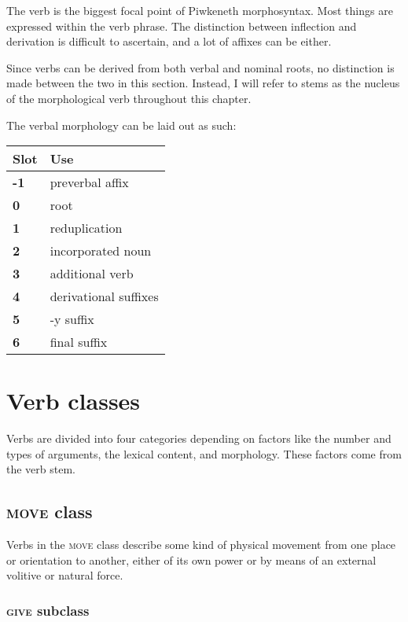 \documentclass[smallroyalvopaper,9pt]{memoir} %
\newcommand{\lang}{Piwkeneth}
\begin{document}
The verb is the biggest focal point of \lang{} morphosyntax. Most things are expressed within the verb phrase. The distinction between inflection and derivation is difficult to ascertain, and a lot of affixes can be either.

Since verbs can be derived from both verbal and nominal roots, no distinction is made between the two in this section. Instead, I will refer to stems as the nucleus of the morphological verb throughout this chapter.

The verbal morphology can be laid out as such:

\begin{table}[ht]
    \centering
    \begin{tabular}{>{\bfseries}ll}
        \toprule
        Slot & Use \\
        \midrule
        -1 & preverbal affix \\
        0 & root \\
        1 & reduplication \\
        2 & incorporated noun \\
        3 & additional verb \\
        4 & derivational suffixes \\
        5 & -y suffix \\
        6 & final suffix \\
        \bottomrule
    \end{tabular}
\end{table}

\section{Verb classes}

Verbs are divided into four categories depending on factors like the number and types of arguments, the lexical content, and morphology. These factors come from the verb stem.

\subsection{\textsc{move} class}

Verbs in the \textsc{move} class describe some kind of physical movement from one place or orientation to another, either of its own power or by means of an external volitive or natural force. 

\subsubsection{\textsc{give} subclass}
\end{document}
